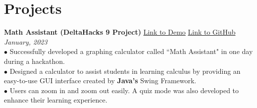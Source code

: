 \documentclass[letterpaper,12pt]{article}
\begin{document}


\section{Projects}

\textbf{Math Assistant (DeltaHacks 9 Project)} \hfill \href{https://devpost.com/software/math-helper-graphing-calculator}{Link to Demo} \hspace{0.2cm} \href{https://github.com/Zicheng-Li/Math_helper}{Link to GitHub} \\
\textit{January, 2023} \\ 
\hspace{0.1cm} $\bullet$\hspace{0.11cm} Successfully developed a graphing calculator called ``Math Assistant" in one day during a hackathon. \\
\hspace{0.1cm} $\bullet$\hspace{0.05cm} Designed a calculator to assist students in learning calculus by providing an easy-to-use GUI interface created by \textbf{Java's} Swing Framework.\\ 
\hspace{0.1cm} $\bullet$\hspace{0.05cm} Users can zoom in and zoom out easily. A quiz mode was also developed to enhance their learning experience.
\end{document}
